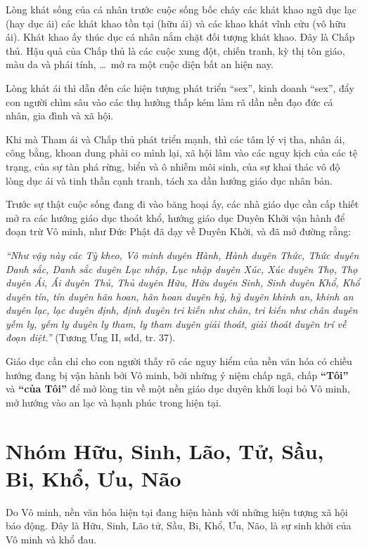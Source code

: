 Lòng khát sống của cá nhân trước cuộc sống bốc cháy các khát khao ngũ dục lạc (hay dục ái) các khát khao tồn tại (hữu ái) và các khao khát vĩnh cửu (vô hữu ái). Khát khao ấy thúc dục cá nhân nắm chặt đối tượng khát khao. Đây là Chấp thủ. Hậu quả của Chấp thủ là các cuộc xung đột, chiến tranh, kỳ thị tôn giáo, màu da và phái tính, \ldots ~mở ra một cuộc diện bất an hiện nay.

Lòng khát ái thì dẫn đến các hiện tượng phát triển ``sex'', kinh doanh ``sex'', đẩy con người chìm sâu vào các thụ hưởng thấp kém làm rã dần nền đạo đức cá nhân, gia đình và xã hội.

Khi mà Tham ái và Chấp thủ phát triển mạnh, thì các tâm lý vị tha, nhân ái, công bằng, khoan dung phải co mình lại, xã hội lâm vào các nguy kịch của các tệ trạng, của sự tàn phá rừng, biển và ô nhiễm môi sinh, của sự khai thác vô độ lòng dục ái và tinh thần cạnh tranh, tách xa dần hướng giáo dục nhân bản.

Trước sự thật cuộc sống đang đi vào băng hoại ấy, các nhà giáo dục cần cấp thiết mở ra các hướng giáo dục thoát khổ, hướng giáo dục Duyên Khởi vận hành để đoạn trừ Vô minh, như Đức Phật đã dạy về Duyên Khởi, và đã mở đường rằng:

\emph{``Như vậy này các Tỳ kheo, Vô minh duyên Hành, Hành duyên Thức, Thức duyên Danh sắc, Danh sắc duyên Lục nhập, Lục nhập duyên Xúc, Xúc duyên Thọ, Thọ duyên Ái, Ái duyên Thủ, Thủ duyên Hữu, Hữu duyên Sinh, Sinh duyên Khổ, Khổ duyên tín, tín duyên hân hoan, hân hoan duyên hỷ, hỷ duyên khinh an, khinh an duyên lạc, lạc duyên định, định duyên tri kiến như chân, tri kiến như chân duyên yếm ly, yếm ly duyên ly tham, ly tham duyên giải thoát, giải thoát duyên trí về đoạn diệt.''} (Tương Ưng II, sđd, tr. 37).

Giáo dục cần chỉ cho con người thấy rõ các nguy hiểm của nền văn hóa có chiều hướng đang bị vận hành bởi Vô minh, bởi những ý niệm chấp ngã, chấp \textbf{``Tôi''} và \textbf{``của Tôi''} để mở lòng tin về một nền giáo dục duyên khởi loại bỏ Vô minh, mở hướng vào an lạc và hạnh phúc trong hiện tại.


\section{Nhóm Hữu, Sinh, Lão, Tử, Sầu, Bi, Khổ, Ưu, Não} %
\label{sec:huu_sinh_lao_tu_sau_bi}

Do Vô minh, nền văn hóa hiện tại đang hiện hành với những hiện tượng xã hội báo động. Đây là Hữu, Sinh, Lão tử, Sầu, Bi, Khổ, Ưu, Não, là sự sinh khởi của Vô minh và khổ đau.

